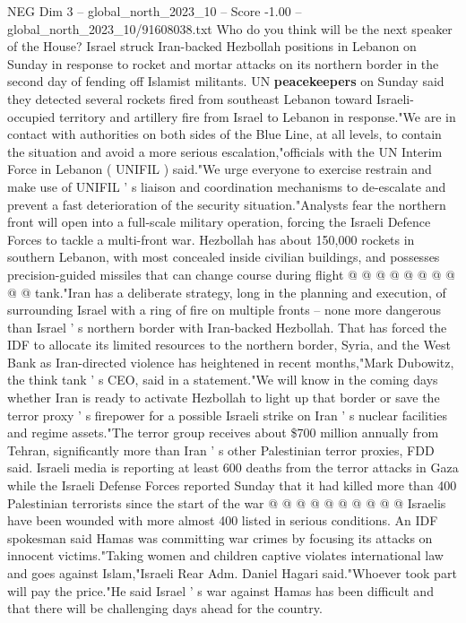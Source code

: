 \begin{textsample}{NEG Dim 3 – global\_north\_2023\_10 – Score -1.00 – global\_north\_2023\_10/91608038.txt}  \label{ex:f3_neg_181}
Who do you think will be the next speaker of the House?
Israel struck Iran-backed Hezbollah positions in Lebanon on Sunday in response to rocket and mortar attacks on its northern border in the second day of fending off Islamist militants.
UN \textbf{peacekeepers} on Sunday said they detected several rockets fired from southeast Lebanon toward Israeli-occupied territory and artillery fire from Israel to Lebanon in response."We are in contact with authorities on both sides of the Blue Line, at all levels, to contain the situation and avoid a more serious escalation,"officials with the UN Interim Force in Lebanon ( UNIFIL ) said."We urge everyone to exercise restrain and make use of UNIFIL ' s liaison and coordination mechanisms to de-escalate and prevent a fast deterioration of the security situation."Analysts fear the northern front will open into a full-scale military operation, forcing the Israeli Defence Forces to tackle a multi-front war.
Hezbollah has about 150,000 rockets in southern Lebanon, with most concealed inside civilian buildings, and possesses precision-guided missiles that can change course during flight @ @ @ @ @ @ @ @ @ @ tank."Iran has a deliberate strategy, long in the planning and execution, of surrounding Israel with a ring of fire on multiple fronts -- none more dangerous than Israel ' s northern border with Iran-backed Hezbollah.
That has forced the IDF to allocate its limited resources to the northern border, Syria, and the West Bank as Iran-directed violence has heightened in recent months,"Mark Dubowitz, the think tank ' s CEO, said in a statement."We will know in the coming days whether Iran is ready to activate Hezbollah to light up that border or save the terror proxy ' s firepower for a possible Israeli strike on Iran ' s nuclear facilities and regime assets."The terror group receives about \$700 million annually from Tehran, significantly more than Iran ' s other Palestinian terror proxies, FDD said.
Israeli media is reporting at least 600 deaths from the terror attacks in Gaza while the Israeli Defense Forces reported Sunday that it had killed more than 400 Palestinian terrorists since the start of the war @ @ @ @ @ @ @ @ @ @ Israelis have been wounded with more almost 400 listed in serious conditions.
An IDF spokesman said Hamas was committing war crimes by focusing its attacks on innocent victims."Taking women and children captive violates international law and goes against Islam,"Israeli Rear Adm.
Daniel Hagari said."Whoever took part will pay the price."He said Israel ' s war against Hamas has been difficult and that there will be challenging days ahead for the country.

\end{textsample}
